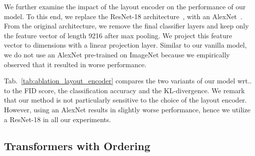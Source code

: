 \documentclass{article}
\makeatletter
\DeclareRobustCommand\onedot{\futurelet\@let@token\@onedot}
\def\@onedot{\ifx\@let@token.\else.\null\fi\xspace}
\def\wrt{wrt\onedot}
\newcommand{\tabref}[1]{Tab.~\ref{#1}}
\makeatother
\begin{document}
We further examine the impact of the layout encoder on the performance of our
model. To this end, we replace the ResNet-18 architecture~\cite{He2016CVPR},
with an AlexNet~\cite{Krizhevsky2012NIPS}. From the original architecture, we
remove the final classifier layers and keep only the feature vector of length
9216 after max pooling. We project this feature vector to  dimensions with
a linear projection layer. Similar to our vanilla model, we do not use an AlexNet pre-trained on
ImageNet because we empirically observed that it resulted in worse performance.
\begin{table}[!h]
    \centering
    \vspace{0.6em}
    \caption{{\bf Ablation Study on the Layout Encoder Architecture.} This table shows a quantitative 
    comparison of ATISS with two different layout encoders.}
    \label{tab:ablation_layout_encoder}
    \vspace{-1.2em}
\end{table}


\tabref{tab:ablation_layout_encoder} compares the two variants of our model
\wrt to the FID score, the classification accuracy and the KL-divergence.
We remark that our method is not particularly sensitive to the choice of the layout encoder.
However, using an AlexNet results in slightly worse performance, hence we
utilize a ResNet-18 in all our experiments.

\subsection{Transformers with Ordering}
\label{subsec:ordered_transformers}
\begin{table}
    \centering
    \vspace{0.6em}
    \caption{{\bf Ablation Study on Ordering.} This table shows a quantitative
    comparison of our approach \wrt two variants of our model that represent rooms as
    ordered sequence of objects.}
    \label{tab:ablations}
\end{table}
\end{document}
